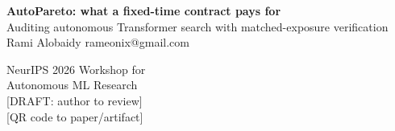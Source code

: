 \documentclass{article}
\newcommand{\todo}[1]{{\color{todo}[#1]}}
\begin{document}
\fontsize{31}{39}\selectfont\color{ink}
\begin{minipage}[t]{0.82\linewidth}
{\sffamily\bfseries\fontsize{86}{96}\selectfont AutoPareto: what a fixed-time contract pays for}\\[18pt]
{\fontsize{40}{48}\selectfont Auditing autonomous Transformer search with matched-exposure verification}\\[14pt]
{\fontsize{34}{40}\selectfont Rami Alobaidy \quad \todo{affiliation} \quad rameonix@gmail.com}
\end{minipage}\hfill
\begin{minipage}[t]{0.17\linewidth}\raggedleft
{\sffamily\fontsize{28}{34}\selectfont NeurIPS 2026 Workshop for\\Autonomous ML Research\\[10pt]\todo{DRAFT: author to review}\\[6pt]\todo{QR code to paper/artifact}}
\end{minipage}

\vspace{22pt}{\color{rule}\rule{\linewidth}{3pt}}\vspace{18pt}
\end{document}

